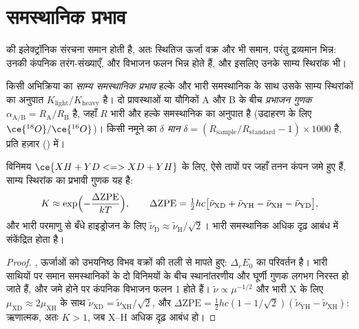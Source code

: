 \section{समस्थानिक प्रभाव}

 की इलेक्ट्रॉनिक संरचना समान होती है, अतः स्थितिज
ऊर्जा वक्र और  भी समान, परंतु द्रव्यमान भिन्न: उनकी कंपनिक
तरंग-संख्याएँ,  और विभाजन फलन भिन्न होते हैं, और इसलिए
उनके साम्य स्थिरांक भी।

\begin{definition}\label{def:b3:statistical-thermo-applied:isotope-effect}
किसी अभिक्रिया का \emph{साम्य समस्थानिक प्रभाव}
हल्के और भारी समस्थानिक के साथ उसके साम्य स्थिरांकों का
अनुपात $K_{\mathrm{light}}/K_{\mathrm{heavy}}$ है। दो प्रावस्थाओं या यौगिकों A और B के बीच
\emph{प्रभाजन गुणक} $\alpha_{\mathrm{A/B}} = R_{\mathrm A}/R_{\mathrm B}$ है, जहाँ
$R$ भारी और हल्के समस्थानिक का अनुपात है (उदाहरण के लिए $\ce{^{18}O}/\ce{^{16}O}$)। किसी नमूने का
\emph{$\delta$ मान} $\delta = (R_{\mathrm{sample}}/R_{\mathrm{standard}}
- 1) \times 1000$ है, प्रति हज़ार (\textperthousand) में।
\end{definition}

\begin{proposition}[शून्य-बिंदु ऊर्जाओं से समस्थानिक प्रभाव]\label{prop:b3:statistical-thermo-applied:zpe-isotope}
विनिमय $\ce{XH + YD <=> XD + YH}$ के लिए, ऐसे तापों पर जहाँ तनन
कंपन जमे हुए हैं, साम्य स्थिरांक का प्रभावी गुणक यह है:
\[
  K \approx \exp\Bigl(-\frac{\Delta\mathrm{ZPE}}{kT}\Bigr), \qquad
  \Delta\mathrm{ZPE} = \tfrac12hc\bigl[\tilde\nu_{\mathrm{XD}} + \tilde\nu_{\mathrm{YH}} - \tilde\nu_{\mathrm{XH}} - \tilde\nu_{\mathrm{YD}}\bigr],
\]
और भारी परमाणु से बँधे हाइड्रोजन के लिए $\tilde\nu_{\mathrm D} \approx \tilde\nu_{\mathrm H}/\sqrt2$। भारी
समस्थानिक अधिक दृढ़ आबंध में संकेंद्रित होता है।
\end{proposition}

\begin{proof}
, ऊर्जाओं को
उभयनिष्ठ विभव वक्रों की तली से मापते हुए: $\Delta_rE_0$  का
परिवर्तन है। भारी साथियों पर समान समस्थानिकों के दो विनिमयों के बीच
स्थानांतरणीय और घूर्णी गुणक लगभग निरस्त हो जाते हैं, और जमे होने पर
कंपनिक विभाजन फलन 1 होते हैं। $\tilde\nu \propto \mu^{-1/2}$ और
भारी X के लिए $\mu_{\mathrm{XD}} \approx 2\mu_{\mathrm{XH}}$ के साथ $\tilde\nu_{\mathrm{XD}} = \tilde\nu_{\mathrm{XH}}/\sqrt2$, और $\Delta\mathrm{ZPE} =
\frac12hc(1 - 1/\sqrt2)(\tilde\nu_{\mathrm{YH}} - \tilde\nu_{\mathrm{XH}})$: ऋणात्मक, अतः $K > 1$, जब X--H अधिक
दृढ़ आबंध हो।
\end{proof}

